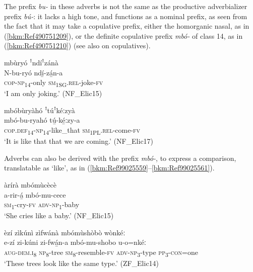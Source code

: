 The prefix \textit{bu-} in these adverbs is not the same as the productive adverbializer prefix \textit{bú-}: it lacks a high tone, and functions as a nominal prefix, as seen from the fact that it may take a copulative prefix, either the homorganic nasal, as in (\ref{bkm:Ref490751209}), or the definite copulative prefix \textit{mbó-} of class 14, as in (\ref{bkm:Ref490751210}) (see also  on copulatives).

\ea
\label{bkm:Ref490751209}
mbùryó ꜝndíꜝzánà\\
\gll N-bu-ryó    ndí̲-zá̲n-a\\
\textsc{cop}-\textsc{np}\textsubscript{14}-only  \textsc{sm}\textsubscript{1SG}.\textsc{rel}-joke-\textsc{fv}\\
\glt ‘I am only joking.’ (NF\_Elic15)
\z

\ea
\label{bkm:Ref490751210}
mbóbùryàhó ꜝtúꜝkéːzyà\\
\gll mbó-bu-ryahó    tú̲-ké̲ːzy-a\\
\textsc{cop}.\textsc{def}\textsubscript{14}-\textsc{np}\textsubscript{14}-like\_that  \textsc{sm}\textsubscript{1PL}.\textsc{rel}-come-\textsc{fv}\\
\glt ‘It is like that that we are coming.’ (NF\_Elic17)
\z

Adverbs can also be derived with the prefix \textit{mbó-}, to express a comparison, translatable as ‘like’, as in (\ref{bkm:Ref99025559}--\ref{bkm:Ref99025561}).

\ea
\label{bkm:Ref99025559}
àrírà mbómùcècè\\
\gll a-rir-á̲  mbó-mu-cece\\
\textsc{sm}\textsubscript{1}-cry-\textsc{fv}  \textsc{adv}-\textsc{np}\textsubscript{1}-baby\\
\glt ‘She cries like a baby.’ (NF\_Elic15)
\z

\ea
\label{bkm:Ref99025561}
èzí zìkúnì zìfwánà mbómùshòbò wònkéː\\
\gll e-zí    zi-kúni  zi-fwá̲n-a mbó-mu-shobo  u-o=nkéː \\
\textsc{aug}-\textsc{dem}.\textsc{i}\textsubscript{8}  \textsc{np}\textsubscript{8}-tree  \textsc{sm}\textsubscript{8}-resemble-\textsc{fv}
\textsc{adv}-\textsc{np}\textsubscript{3}-type  \textsc{pp}\textsubscript{3}-\textsc{con}=one\\
\glt ‘These trees look like the same type.’ (ZF\_Elic14)
\z

